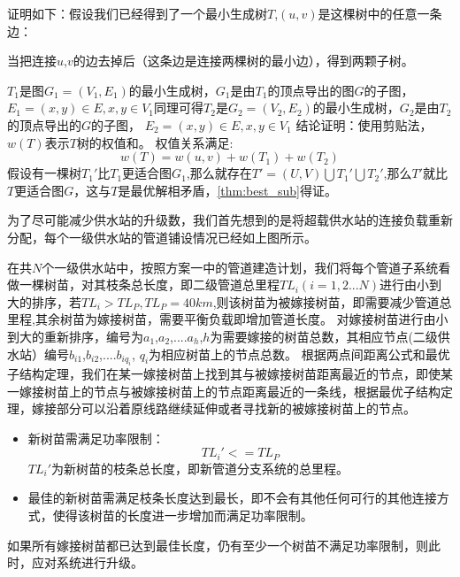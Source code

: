 \documentclass{cumcmthesis}
\begin{document}
    证明如下：假设我们已经得到了一个最小生成树$T$,$(u,v)$是这棵树中的任意一条边：
    
    当把连接$u$,$v$的边去掉后（这条边是连接两棵树的最小边），得到两颗子树。
    
    
    $T_{1}$是图$G_{1}=(V_{1},E_{1})$的最小生成树，$G_{1}$是由$T_{1}$的顶点导出的图$G$的子图，$E_{1}={(x,y)\in E,x,y\in V_{1}}$同理可得$T_{2}$是$G_{2}=(V_{2},E_{2})$的最小生成树，$G_{2}$是由$T_{2}$的顶点导出的$G$的子图，
    $E_{2}={(x,y)\in E,x,y\in V_{1}}$
    结论证明：使用剪贴法，$w(T)$表示$T$树的权值和。
    权值关系满足:$$w(T)=w(u,v)+w(T_{1})+w(T_{2})$$
    假设有一棵树$T_{1}'$比$T_{1}$更适合图$G_{1}$,那么就存在$T'={(U,V)}\bigcup T_{1}'\bigcup T_{2}'$,那么$T'$就比$T$更适合图$G$，这与$T$是最优解相矛盾，\cref{thm:best_sub}得证。
    

    为了尽可能减少供水站的升级数，我们首先想到的是将超载供水站的连接负载重新分配，每个一级供水站的管道铺设情况已经如上图所示。

    在共$N$个一级供水站中，按照方案一中的管道建造计划，我们将每个管道子系统看做一棵树苗，对其枝条总长度，即二级管道总里程$TL_{i}(i=1,2...N)$进行由小到大的排序，若$TL_{i}>TL_{P},TL_{P}=40km$,则该树苗为被嫁接树苗，即需要减少管道总里程,其余树苗为嫁接树苗，需要平衡负载即增加管道长度。
    对嫁接树苗进行由小到大的重新排序，编号为$a_{1}$,$a_{2}$,....$a_{h}$,$h$为需要嫁接的树苗总数，其相应节点(二级供水站）编号$b_{i1}$,$b_{i2}$,....$b_{iq_{i}}$, $q_{i}$为相应树苗上的节点总数。
    根据两点间距离公式和最优子结构定理，我们在某一嫁接树苗上找到其与被嫁接树苗距离最近的节点，即使某一嫁接树苗上的节点与被嫁接树苗上的节点距离最近的一条线，根据最优子结构定理，嫁接部分可以沿着原线路继续延伸或者寻找新的被嫁接树苗上的节点。
  
    \begin{itemize}
    \item 新树苗需满足功率限制：
    $$TL_{i}'<=TL_{P}$$
    $TL_{i}'$为新树苗的枝条总长度，即新管道分支系统的总里程。
    \item 最佳的新树苗需满足枝条长度达到最长，即不会有其他任何可行的其他连接方式，使得该树苗的长度进一步增加而满足功率限制。
    
    \end{itemize}

    如果所有嫁接树苗都已达到最佳长度，仍有至少一个树苗不满足功率限制，则此时，应对系统进行升级。
 
\end{document}
